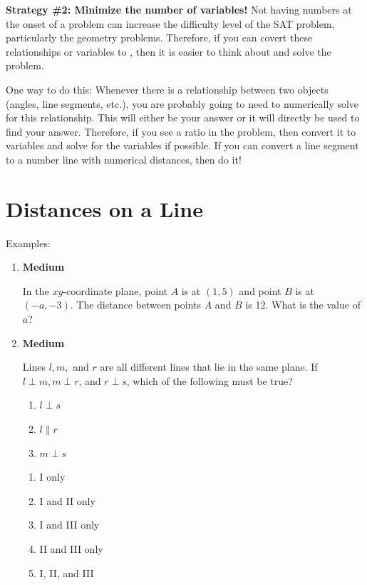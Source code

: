 \bigskip
\textbf{Strategy \#2: Minimize the number of variables!} Not having numbers at the onset of a problem can increase the difficulty level of the SAT problem, particularly the geometry problems. Therefore, if you can covert these relationships or variables to \underline{\hspace{1.5in}}, then it is easier to think about and solve the problem.

\bigskip
One way to do this: Whenever there is a relationship between two objects (angles, line segments, etc.), you are probably going to need to numerically solve for this relationship. This will either be your answer or it will directly be used to find your answer. Therefore, if you see a ratio in the problem, then convert it to variables and solve for the variables if possible. If you can convert a line segment to a number line with numerical distances, then do it!

\vfill
\newpage
\section{Distances on a Line}

\bigskip
Examples:

\begin{multicols}{2}
\begin{enumerate}[label*=\arabic*.]
\item \textbf{Medium}

In the $xy$-coordinate plane, point $A$ is at $(1,5)$ and point $B$ is at $(-a,-3)$. The distance between points $A$ and $B$ is 12. What is the value of $a$?
\vfill
\phantom{}
\columnbreak
\item \textbf{Medium}

Lines $l, m,$ and $r$ are all different lines that lie in the same plane. If $l\perp m, m\perp r$, and $r\perp s$, which of the following must be true?

\bigskip
\begin{enumerate}[label=\Roman*.]
\item $l\perp s$
\item $l\parallel r$
\item $m\perp s$
\end{enumerate}

\begin{enumerate}[label=(\Alph*)]
\item I only
\item I and II only
\item I and III only
\item II and III only
\item I, II, and III
\end{enumerate}
\end{enumerate}
\end{multicols}

